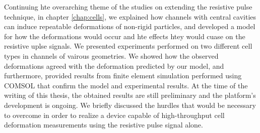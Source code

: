 		Continuing hte overarching theme of the studies on extending the resistive pulse technique, in chapter \ref{chap:cells}, we explained how channels with central cavities can induce repeatable deformations of non-rigid particles, and developed a model for how the deformations would occur and hte effects htey would cuase on the resistive uplse signals. We presented experiments performed on two different cell types in channels of vairous geometries. We showed how the observed deformations agreed with the deformation predicted by our model, and furthermore, provided results from finite element simulation performed using COMSOL that confirm the model and experimental results. At the time of the writing of this thesis, the obtained results are still preliminary and the platform's development is ongoing. We briefly discussed the hurdles that would be necessary to overcome in order to realize a device capable of high-throughput cell deformation measurements using the resistive pulse signal alone. 
	
		




			
			
			

			
			
			
			

			
			


			
	





